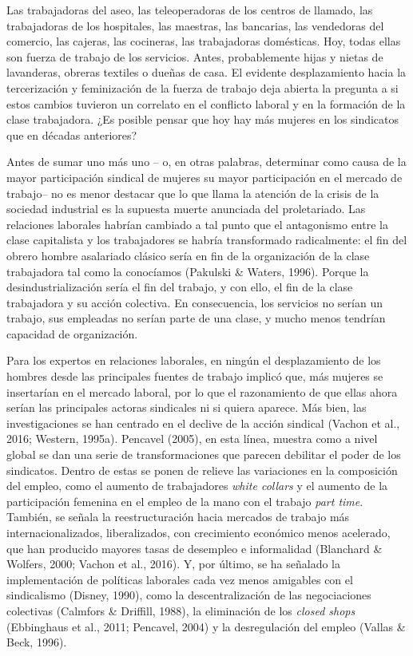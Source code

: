\documentclass[
]{book}
\begin{document}
Las trabajadoras del aseo, las teleoperadoras de los centros de llamado, las trabajadoras de los hospitales, las maestras, las bancarias, las vendedoras del comercio, las cajeras, las cocineras, las trabajadoras domésticas. Hoy, todas ellas son fuerza de trabajo de los servicios. Antes, probablemente hijas y nietas de lavanderas, obreras textiles o dueñas de casa. El evidente desplazamiento hacia la tercerización y feminización de la fuerza de trabajo deja abierta la pregunta a si estos cambios tuvieron un correlato en el conflicto laboral y en la formación de la clase trabajadora. ¿Es posible pensar que hoy hay más mujeres en los sindicatos que en décadas anteriores?

Antes de sumar uno más uno -- o, en otras palabras, determinar como causa de la mayor participación sindical de mujeres su mayor participación en el mercado de trabajo-- no es menor destacar que lo que llama la atención de la crisis de la sociedad industrial es la supuesta muerte anunciada del proletariado. Las relaciones laborales habrían cambiado a tal punto que el antagonismo entre la clase capitalista y los trabajadores se habría transformado radicalmente: el fin del obrero hombre asalariado clásico sería en fin de la organización de la clase trabajadora tal como la conocíamos (Pakulski \& Waters, 1996). Porque la desindustrialización sería el fin del trabajo, y con ello, el fin de la clase trabajadora y su acción colectiva. En consecuencia, los servicios no serían un trabajo, sus empleadas no serían parte de una clase, y mucho menos tendrían capacidad de organización.

Para los expertos en relaciones laborales, en ningún el desplazamiento de los hombres desde las principales fuentes de trabajo implicó que, más mujeres se insertarían en el mercado laboral, por lo que el razonamiento de que ellas ahora serían las principales actoras sindicales ni si quiera aparece. Más bien, las investigaciones se han centrado en el declive de la acción sindical (Vachon et al., 2016; Western, 1995a). Pencavel (2005), en esta línea, muestra como a nivel global se dan una serie de transformaciones que parecen debilitar el poder de los sindicatos. Dentro de estas se ponen de relieve las variaciones en la composición del empleo, como el aumento de trabajadores \emph{white collars} y el aumento de la participación femenina en el empleo de la mano con el trabajo \emph{part time}. También, se señala la reestructuración hacia mercados de trabajo más internacionalizados, liberalizados, con crecimiento económico menos acelerado, que han producido mayores tasas de desempleo e informalidad (Blanchard \& Wolfers, 2000; Vachon et al., 2016). Y, por último, se ha señalado la implementación de políticas laborales cada vez menos amigables con el sindicalismo (Disney, 1990), como la descentralización de las negociaciones colectivas (Calmfors \& Driffill, 1988), la eliminación de los \emph{closed shops} (Ebbinghaus et al., 2011; Pencavel, 2004) y la desregulación del empleo (Vallas \& Beck, 1996).
\end{document}
